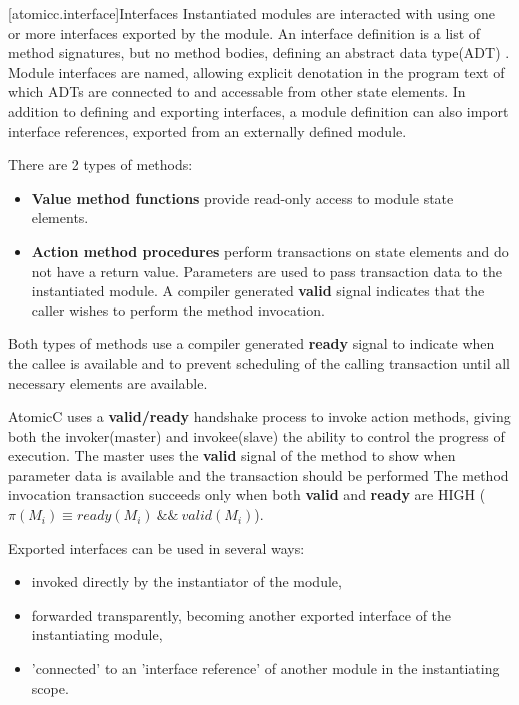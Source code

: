 [atomicc.interface]{Interfaces}
Instantiated modules are interacted with using one or more interfaces exported by the module.
An interface definition is a list of method signatures, but no method bodies, defining
an abstract data type(ADT) \cite{Liskov74programmingwith}.
Module interfaces are named, 
allowing explicit denotation in the program text
of which ADTs are connected to and accessable from other state elements.
In addition to defining and exporting interfaces,
a module definition can also import
interface references, exported from an
externally defined module.

There are 2 types of methods:
\begin{itemize}
\item \textbf{Value method functions} provide read-only access to module state elements.
\item \textbf{Action method procedures} perform transactions on state elements
and do not have a return value.
Parameters are used to pass transaction data to the instantiated module.
A compiler generated
\textbf{valid} signal indicates that the caller wishes to perform the method invocation.
\end{itemize}

Both types of methods use a compiler generated \textbf{ready} signal
to indicate when the callee is available and
to prevent scheduling of the calling transaction until all necessary elements are
available.

AtomicC uses a \textbf{valid/ready} handshake process\cite{Fletcher2009, AXISpec} to invoke action methods,
giving both the invoker(master) and invokee(slave) the ability to control the progress of execution.
The master uses the \textbf{valid} signal
of the method to show when parameter data is available and the transaction should be performed
The method invocation transaction succeeds only when
both \textbf{valid} and \textbf{ready} are HIGH ($\pi(M_{i}) \equiv ready(M_{i})\ \&\&\ valid(M_{i})$).

Exported interfaces can be used in several ways:
\begin{itemize}
\item invoked directly by the instantiator of the module,
\item forwarded transparently, becoming another exported interface of the instantiating module,
\item 'connected' to an 'interface reference' of another module in the instantiating scope.
\end{itemize}

